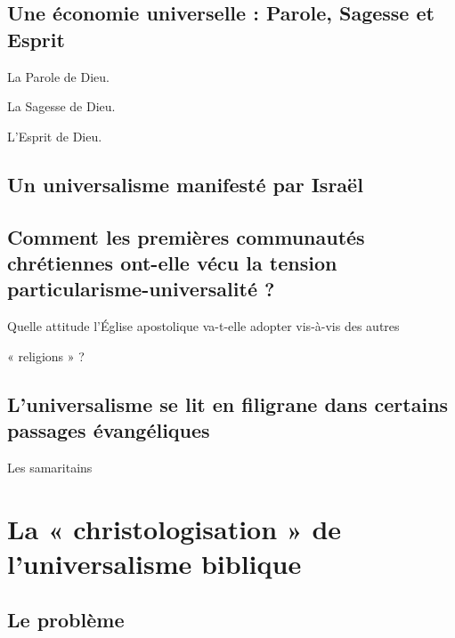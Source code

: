     \subsection{Une économie universelle : Parole, Sagesse et Esprit}
    

  

     
      
      La Parole de Dieu.
      
     
      
      La Sagesse de Dieu.
      
     
      
      L'Esprit de Dieu.
      
  
   
    
    \subsection{Un universalisme manifesté par Israël}
    
   
    
    \subsection{Comment les premières communautés chrétiennes ont-elle vécu la
    tension particularisme-universalité ?}
    

  

     
      
      Quelle attitude l'Église apostolique va-t-elle adopter vis-à-vis
      des autres
      
  




« religions » ?


\subsection{
  L'universalisme se lit en filigrane dans certains passages
  évangéliques}
  
 
  Les samaritains
  
 

  \section{La « christologisation » de l'universalisme
  biblique} 



   
    
    \subsection{Le problème}
    
